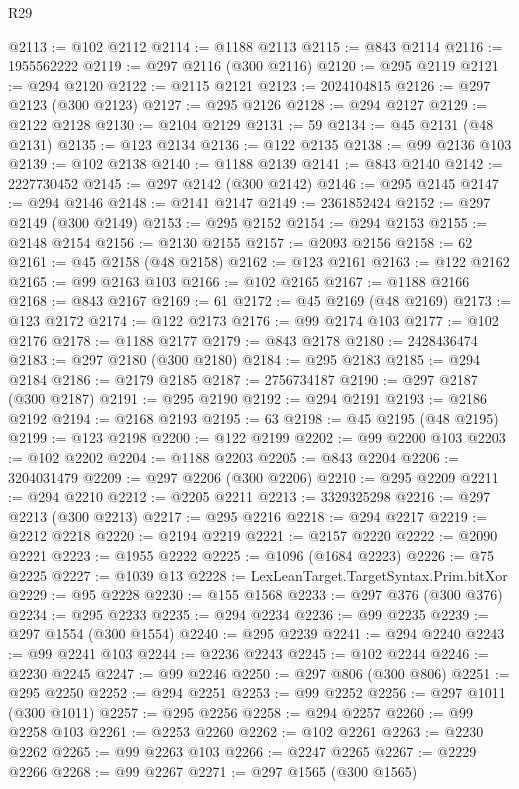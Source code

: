 \begin{lexlean}{R29}
\begin{coremodule}
@2113 := @102 @2112
@2114 := @1188 @2113
@2115 := @843 @2114
@2116 := 1955562222
@2119 := @297 @2116 (@300 @2116)
@2120 := @295 @2119
@2121 := @294 @2120
@2122 := @2115 @2121
@2123 := 2024104815
@2126 := @297 @2123 (@300 @2123)
@2127 := @295 @2126
@2128 := @294 @2127
@2129 := @2122 @2128
@2130 := @2104 @2129
@2131 := 59
@2134 := @45 @2131 (@48 @2131)
@2135 := @123 @2134
@2136 := @122 @2135
@2138 := @99 @2136 @103
@2139 := @102 @2138
@2140 := @1188 @2139
@2141 := @843 @2140
@2142 := 2227730452
@2145 := @297 @2142 (@300 @2142)
@2146 := @295 @2145
@2147 := @294 @2146
@2148 := @2141 @2147
@2149 := 2361852424
@2152 := @297 @2149 (@300 @2149)
@2153 := @295 @2152
@2154 := @294 @2153
@2155 := @2148 @2154
@2156 := @2130 @2155
@2157 := @2093 @2156
@2158 := 62
@2161 := @45 @2158 (@48 @2158)
@2162 := @123 @2161
@2163 := @122 @2162
@2165 := @99 @2163 @103
@2166 := @102 @2165
@2167 := @1188 @2166
@2168 := @843 @2167
@2169 := 61
@2172 := @45 @2169 (@48 @2169)
@2173 := @123 @2172
@2174 := @122 @2173
@2176 := @99 @2174 @103
@2177 := @102 @2176
@2178 := @1188 @2177
@2179 := @843 @2178
@2180 := 2428436474
@2183 := @297 @2180 (@300 @2180)
@2184 := @295 @2183
@2185 := @294 @2184
@2186 := @2179 @2185
@2187 := 2756734187
@2190 := @297 @2187 (@300 @2187)
@2191 := @295 @2190
@2192 := @294 @2191
@2193 := @2186 @2192
@2194 := @2168 @2193
@2195 := 63
@2198 := @45 @2195 (@48 @2195)
@2199 := @123 @2198
@2200 := @122 @2199
@2202 := @99 @2200 @103
@2203 := @102 @2202
@2204 := @1188 @2203
@2205 := @843 @2204
@2206 := 3204031479
@2209 := @297 @2206 (@300 @2206)
@2210 := @295 @2209
@2211 := @294 @2210
@2212 := @2205 @2211
@2213 := 3329325298
@2216 := @297 @2213 (@300 @2213)
@2217 := @295 @2216
@2218 := @294 @2217
@2219 := @2212 @2218
@2220 := @2194 @2219
@2221 := @2157 @2220
@2222 := @2090 @2221
@2223 := @1955 @2222
@2225 := @1096 (@1684 @2223)
@2226 := @75 @2225
@2227 := @1039 @13
@2228 := LexLeanTarget.TargetSyntax.Prim.bitXor
@2229 := @95 @2228
@2230 := @155 @1568
@2233 := @297 @376 (@300 @376)
@2234 := @295 @2233
@2235 := @294 @2234
@2236 := @99 @2235
@2239 := @297 @1554 (@300 @1554)
@2240 := @295 @2239
@2241 := @294 @2240
@2243 := @99 @2241 @103
@2244 := @2236 @2243
@2245 := @102 @2244
@2246 := @2230 @2245
@2247 := @99 @2246
@2250 := @297 @806 (@300 @806)
@2251 := @295 @2250
@2252 := @294 @2251
@2253 := @99 @2252
@2256 := @297 @1011 (@300 @1011)
@2257 := @295 @2256
@2258 := @294 @2257
@2260 := @99 @2258 @103
@2261 := @2253 @2260
@2262 := @102 @2261
@2263 := @2230 @2262
@2265 := @99 @2263 @103
@2266 := @2247 @2265
@2267 := @2229 @2266
@2268 := @99 @2267
@2271 := @297 @1565 (@300 @1565)

\end{coremodule}
\end{lexlean}
